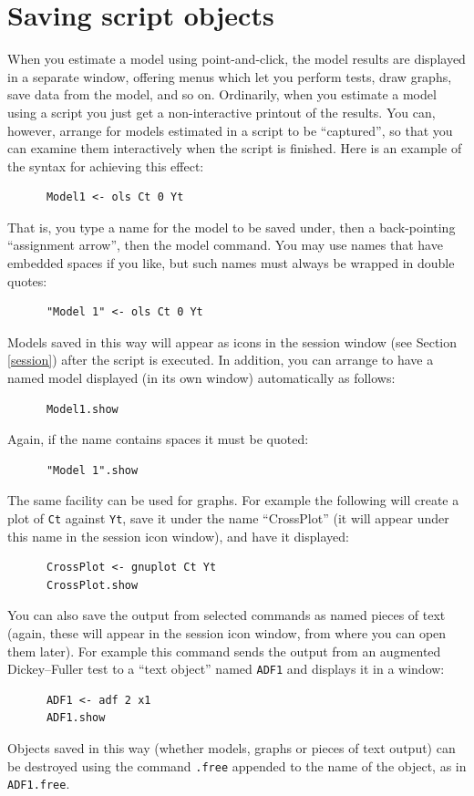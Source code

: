 \section{Saving script objects}
\label{sect-script-objects}

When you estimate a model using point-and-click, the model
      results are displayed in a separate window, offering menus which
      let you perform tests, draw graphs, save data from the model,
      and so on.  Ordinarily, when you estimate a model using a script
      you just get a non-interactive printout of the results.  You
      can, however, arrange for models estimated in a script to be
      ``captured'', so that you can examine them
      interactively when the script is finished.  Here is an example
      of the syntax for achieving this effect:
    
\begin{verbatim}
      Model1 <- ols Ct 0 Yt\end{verbatim}
That is, you type a name for the model to be saved under,
    then a back-pointing ``assignment arrow'', then
    the model command.  You may use names that have embedded spaces
    if you like, but such names must always be wrapped in double
    quotes:
\begin{verbatim}
      "Model 1" <- ols Ct 0 Yt\end{verbatim}
Models saved in this way will appear as icons in the
       session window (see Section \ref{session}) after the script is executed.  In
      addition, you can arrange to have a named model displayed (in
      its own window) automatically as follows:
\begin{verbatim}
      Model1.show\end{verbatim}
Again, if the name contains spaces it must be
      quoted:
\begin{verbatim}
      "Model 1".show\end{verbatim}
The same facility can be used for graphs.  For example the
      following will create a plot of \verb+Ct+ against
      \verb+Yt+, save it under the name
      ``CrossPlot'' (it will appear under this name in the
      session icon window), and have it displayed:
\begin{verbatim}
      CrossPlot <- gnuplot Ct Yt
      CrossPlot.show\end{verbatim}
You can also save the output from selected commands as named
    pieces of text (again, these will appear in the session icon
    window, from where you can open them later).  For example this
    command sends the output from an augmented Dickey--Fuller
    test to a ``text object'' named
    \verb+ADF1+ and displays it in a window:
\begin{verbatim}
      ADF1 <- adf 2 x1
      ADF1.show\end{verbatim}
Objects saved in this way (whether models, graphs or pieces
      of text output) can be destroyed using the command
      \verb+.free+ appended to the name of the object, as
      in \verb+ADF1.free+.

